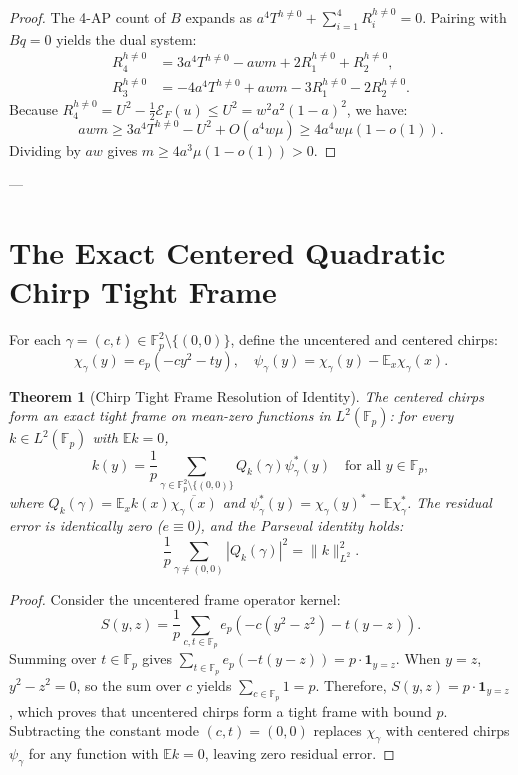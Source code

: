 \documentclass[11pt,reqno]{amsart}
\theoremstyle{plain}
\newtheorem{theorem}{Theorem}[section]
\theoremstyle{definition}
\newcommand{\F}{\mathbb{F}}
\newcommand{\E}{\mathbb{E}}
\newcommand{\one}{\mathbf{1}}
\begin{document}
\begin{proof}
The 4-AP count of $B$ expands as $a^4 T^{h \ne 0} + \sum_{i=1}^4 R_i^{h \ne 0} = 0$.
Pairing with $B q = 0$ yields the dual system:
\begin{align}
R_4^{h \ne 0} &= 3 a^4 T^{h \ne 0} - a w m + 2 R_1^{h \ne 0} + R_2^{h \ne 0}, \\
R_3^{h \ne 0} &= -4 a^4 T^{h \ne 0} + a w m - 3 R_1^{h \ne 0} - 2 R_2^{h \ne 0}.
\end{align}
Because $R_4^{h \ne 0} = U^2 - \frac{1}{2} \mathcal{E}_F(u) \le U^2 = w^2 a^2 (1-a)^2$, we have:
\begin{equation}
a w m \ge 3 a^4 T^{h \ne 0} - U^2 + O(a^4 w \mu) \ge 4 a^4 w \mu (1 - o(1)).
\end{equation}
Dividing by $a w$ gives $m \ge 4 a^3 \mu (1 - o(1)) > 0$.
\end{proof}

---

\section{The Exact Centered Quadratic Chirp Tight Frame}

For each $\gamma = (c, t) \in \F_p^2 \setminus \{(0, 0)\}$, define the uncentered and centered chirps:
\begin{equation}
\chi_\gamma(y) = e_p(-cy^2 - ty), \quad \psi_\gamma(y) = \chi_\gamma(y) - \E_x \chi_\gamma(x).
\end{equation}

\begin{theorem}[Chirp Tight Frame Resolution of Identity]\label{thm:tight_frame}
The centered chirps form an exact tight frame on mean-zero functions in $L^2(\F_p)$:
for every $k \in L^2(\F_p)$ with $\E k = 0$,
\begin{equation}
k(y) = \frac{1}{p} \sum_{\gamma \in \F_p^2 \setminus \{(0, 0)\}} Q_k(\gamma) \psi_\gamma^*(y) \quad \text{for all } y \in \F_p,
\end{equation}
where $Q_k(\gamma) = \E_x k(x) \overline{\chi_\gamma(x)}$ and $\psi_\gamma^*(y) = \chi_\gamma(y)^* - \E \chi_\gamma^*$.
The residual error is identically zero ($e \equiv 0$), and the Parseval identity holds:
\begin{equation}
\frac{1}{p} \sum_{\gamma \ne (0, 0)} |Q_k(\gamma)|^2 = \|k\|_{L^2}^2.
\end{equation}
\end{theorem}

\begin{proof}
Consider the uncentered frame operator kernel:
\begin{equation}
S(y, z) = \frac{1}{p} \sum_{c, t \in \F_p} e_p(-c(y^2 - z^2) - t(y - z)).
\end{equation}
Summing over $t \in \F_p$ gives $\sum_{t \in \F_p} e_p(-t(y - z)) = p \cdot \one_{y=z}$.
When $y = z$, $y^2 - z^2 = 0$, so the sum over $c$ yields $\sum_{c \in \F_p} 1 = p$.
Therefore, $S(y, z) = p \cdot \one_{y=z}$, which proves that uncentered chirps form a tight frame with bound $p$.
Subtracting the constant mode $(c, t) = (0, 0)$ replaces $\chi_\gamma$ with centered chirps $\psi_\gamma$ for any function with $\E k = 0$, leaving zero residual error.
\end{proof}
\end{document}
